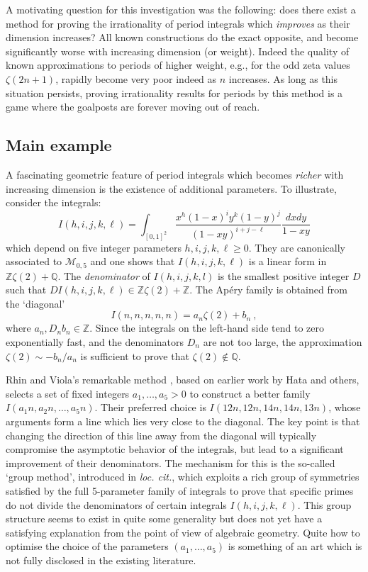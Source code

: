 \documentclass[a4paper,10pt]{amsart}
\theoremstyle{definition}
\theoremstyle{remark}
\numberwithin{equation}{section}
\newcommand{\Z}{\mathbb Z}
\newcommand{\Q}{\mathbb Q}
\newcommand{\0}{\color{blue}{\mathsf{0}}}
\begin{document}
A motivating question for this investigation was the following: does there exist a method for proving the  irrationality of  period integrals  which \emph{improves} as their dimension  increases? 
All known constructions do the exact opposite, and become significantly worse with increasing dimension (or weight). Indeed  the quality of  known approximations to periods of higher weight, e.g., for the odd zeta values $\zeta(2n+1)$, rapidly become very poor indeed as $n$ increases.   As long as this situation persists,  proving irrationality results for periods  by this method is a game where the goalposts are forever moving out of reach. 


\subsection{Main example} 
A fascinating geometric feature of period integrals  which  becomes  \emph{richer} with increasing  dimension is the  existence of additional parameters. 
To illustrate, consider the  integrals: 
\begin{equation} \label{intro:Ihijkl} 
 I(h,i,j,k,\ell) = \int_{[0,1]^2}  \frac{x^h (1-x)^i y^k (1-y)^j }{(1-xy)^{i+j-\ell}}  \frac{dxdy}{1-xy}\end{equation} 
which depend on five integer parameters  $h,i,j,k,\ell\geq 0$. They are canonically associated to $\mathcal{M}_{0,5}$ and one shows that $I(h,i,j,k,\ell)$ is a linear form in $\Z \zeta(2) + \Q$.  The \emph{denominator} of $I(h,i,j,k,l)$ is  the smallest positive integer $D$ such that $D I(h,i,j,k,\ell) \in \Z \zeta(2) + \Z$.  The Ap\'ery family  is obtained from the `diagonal'  
\[ I(n,n,n,n,n) = a_n \zeta(2) + b_n \ , \]
where $a_n, D_n b_n \in \Z$.
Since the integrals on the left-hand side tend  to zero exponentially fast, and  the denominators $D_n$ are  not too large, the approximation $\zeta(2) \sim -b_n/a_n$ is sufficient to prove that $\zeta(2) \notin \Q$.

Rhin and Viola's remarkable method \cite{RVzeta2, RVzeta3}, based on earlier work by Hata and others, selects a set of fixed integers    $a_1,\ldots, a_5>0$ to construct a better family    $I(a_1 n, a_2 n, \ldots, a_5 n)$. 
Their preferred choice is $I(12n, 12n, 14n, 14n, 13n)$, whose arguments form a line which lies very  close to the diagonal.  The key point is that changing the direction of this line away from the diagonal will typically compromise the asymptotic behavior of the integrals, but lead to a significant improvement of their denominators. The mechanism for this  is the so-called `group method', introduced in \emph{loc. cit.}, which exploits a rich group of symmetries  satisfied by  the full 5-parameter family of integrals to prove that specific primes  do not divide the denominators  of certain integrals $I(h,i,j,k,\ell)$.   This group structure seems to exist in quite some generality but does not yet have a satisfying explanation from the point of view of algebraic geometry.  Quite how to optimise the choice of the parameters $(a_1,\ldots, a_5)$ is something of an art which is not fully disclosed in the existing literature. 
\end{document}
